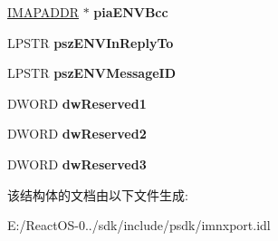 \begin{DoxyCompactItemize}
\hyperlink{struct_i_i_m_a_p_callback_1_1tag_i_m_a_p_a_d_d_r}{I\+M\+A\+P\+A\+D\+DR} $\ast$ {\bfseries pia\+E\+N\+V\+Bcc}
\item 
\mbox{\label{struct_i_i_m_a_p_callback_1_1tag_f_e_t_c_h___c_m_d___r_e_s_u_l_t_s___e_x_a226d14c6c72fc7f99819e783eb9b8e4e}} 
L\+P\+S\+TR {\bfseries psz\+E\+N\+V\+In\+Reply\+To}
\item 
\mbox{\label{struct_i_i_m_a_p_callback_1_1tag_f_e_t_c_h___c_m_d___r_e_s_u_l_t_s___e_x_a2b5f1287f7d3416697dbf69fbd7ff771}} 
L\+P\+S\+TR {\bfseries psz\+E\+N\+V\+Message\+ID}
\item 
\mbox{\label{struct_i_i_m_a_p_callback_1_1tag_f_e_t_c_h___c_m_d___r_e_s_u_l_t_s___e_x_a9cb392990e49b1412d22b7dbe74dda59}} 
D\+W\+O\+RD {\bfseries dw\+Reserved1}
\item 
\mbox{\label{struct_i_i_m_a_p_callback_1_1tag_f_e_t_c_h___c_m_d___r_e_s_u_l_t_s___e_x_a4e6f8c40f156c19d95dcaa3732285854}} 
D\+W\+O\+RD {\bfseries dw\+Reserved2}
\item 
\mbox{\label{struct_i_i_m_a_p_callback_1_1tag_f_e_t_c_h___c_m_d___r_e_s_u_l_t_s___e_x_ad4831f9a2862a6b8a8e2d0b1e95fd6a8}} 
D\+W\+O\+RD {\bfseries dw\+Reserved3}
\end{DoxyCompactItemize}


该结构体的文档由以下文件生成\+:\begin{DoxyCompactItemize}
\item 
E\+:/\+React\+O\+S-\/0../sdk/include/psdk/imnxport.\+idl\end{DoxyCompactItemize}
